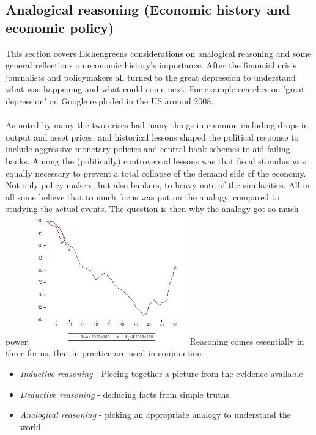\documentclass[12pt, a4paper]{article}
\begin{document}
\begin{multicols}{2}
\subsection{Analogical reasoning (Economic history and economic policy)}
This section covers Eichengreens considerations on analogical reasoning and some general reflections on economic history's importance. After the financial crisis journalists and policymakers all turned to the great depression to understand what was happening and what could come next. For example searches on 'great depression' on Google exploded in the US around 2008. 
\\ \\
As noted by many the two crises had many things in common including drops in output and asset prices, and historical lessons shaped the political response to include aggressive monetary policies and central bank schemes to aid failing banks. Among the (politically) controversial lessons was that fiscal stimulus was equally necessary to prevent a total collapse of the demand side of the economy. 
Not only policy makers, but also bankers, to heavy note of the similarities. All in all some believe that to much focus was put on the analogy, compared to studying the actual events. The question is then why the analogy got so much power. 
\includegraphics[width = 0.5\textwidth]{Economic_Rules_-_lecture_6_TBA-1.jpg}
Reasoning comes essentially in three forms, that in practice are used in conjunction
\begin{itemize}
\item \textit{Inductive reasoning} - Piecing together a picture from the evidence available
\item \textit{Deductive reasoning} - deducing facts from simple truths 
\item \textit{Analogical reasoning} - picking an appropriate analogy to understand the world
\end{itemize}

\end{multicols}
\end{document}
